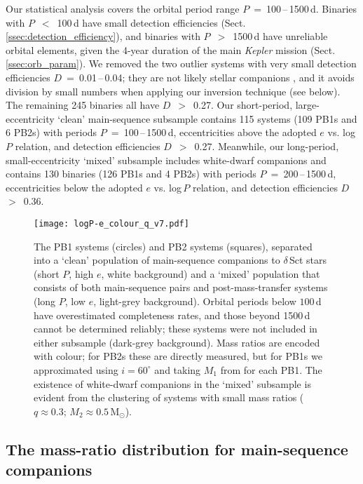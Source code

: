 \documentclass[a4paper,fleqn,usenatbib]{mnras}
\begin{document}
Our statistical analysis covers the orbital period range \mbox{$P$~=~100\,--\,1500\,d.} Binaries with $P$~$<$~100\,d have small detection efficiencies (Sect.\,\ref{ssec:detection_efficiency}), and binaries with $P$~$>$~1500\,d have unreliable orbital elements, given the 4-year duration of the main {\it Kepler} mission (Sect.\,\ref{ssec:orb_param}). We removed the two outlier systems with very small detection efficiencies $D$~=~0.01\,--\,0.04; they are not likely stellar companions \citep{murphyetal2016c}, and it avoids division by small numbers when applying our inversion technique (see below). The remaining 245 binaries all have $D$~$>$~0.27.  Our short-period, large-eccentricity `clean' main-sequence subsample contains 115 systems (109 PB1s and 6 PB2s) with periods $P$~=~100\,--\,1500\,d, eccentricities above the adopted $e$ vs. log\,$P$ relation, and detection efficiencies $D$~$>$~0.27.  Meanwhile, our long-period, small-eccentricity `mixed' subsample includes white-dwarf companions and contains 130 binaries (126 PB1s and 4 PB2s) with periods $P$~=~200\,--\,1500\,d, eccentricities below the adopted $e$ vs. log\,$P$ relation, and detection efficiencies $D$~$>$~0.36.


\begin{figure}
\begin{center}
\texttt{[image: logP-e\_colour\_q\_v7.pdf]}
\caption{The PB1 systems (circles) and PB2 systems (squares), separated into a `clean' population of main-sequence companions to $\delta$\,Sct stars (short $P$, high $e$, white background) and a `mixed' population that consists of both main-sequence pairs and post-mass-transfer systems (long $P$, low $e$, light-grey background). Orbital periods below $100$\,d have overestimated completeness rates, and those beyond 1500\,d cannot be determined reliably; these systems were not included in either subsample (dark-grey background). Mass ratios are encoded with colour; for PB2s these are directly measured, but for PB1s we approximated using $i=60^{\circ}$ and taking $M_1$ from \citet{huberetal2014} for each PB1. The existence of white-dwarf companions in the `mixed' subsample is evident from the clustering of systems with small mass ratios ($q \approx 0.3$; $M_2 \approx 0.5$\,M$_{\odot}$).}
\label{fig:separate}
\end{center}
\end{figure}



\subsection{The mass-ratio distribution for main-sequence companions}
\label{ssec:ms_pop}
\end{document}
